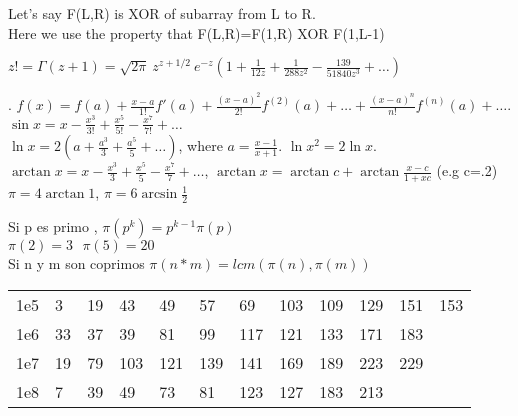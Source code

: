 Let's say F(L,R) is XOR of subarray from L to R.\\
Here we use the property that F(L,R)=F(1,R) XOR F(1,L-1)



$z! = \Gamma(z+1) = \sqrt{2 \pi}\ z^{z+1/2}\ e^{-z}
(1 + \frac{1}{12z} + \frac{1}{288 z^2} - \frac{139}{51840 z^3} + \dots)$

.
$f(x) = f(a) + \frac{x-a}{1!} f'(a) + \frac{(x-a)^2}{2!} f^{(2)}(a) + \dots + \frac{(x-a)^n}{n!} f^{(n)}(a) + \dots$. \\
$\sin x = x - \frac{x^3}{3!} + \frac{x^5}{5!} - \frac{x^7}{7!} + \dots$ \\
$\ln x = 2(a+\frac{a^3}{3}+\frac{a^5}{5}+\dots)$, where $a=\frac{x-1}{x+1}$. $\ln x^2 = 2 \ln x$. \\
$\arctan x = x - \frac{x^3}{3} + \frac{x^5}{5} - \frac{x^7}{7} + \dots$,
$\arctan x = \arctan c + \arctan \frac{x-c}{1+xc}$ (e.g c=.2) \\
$\pi = 4 \arctan 1$, $\pi = 6 \arcsin \frac{1}{2}$

Si p es primo , $ \pi(p^k) = p^{k-1}\pi(p)$\\
$\pi(2)=3 \textit{              }\pi(5)=20 $\\
Si n y m son coprimos $\pi(n*m) = lcm( \pi(n),\pi(m) )$



\begin{tabular}{l l l l l l l l l l l l}
    1e5 & 3 & 19 & 43 & 49 & 57 & 69 & 103 & 109 & 129 & 151 & 153 \\
    1e6 & 33 & 37 & 39 & 81 & 99 & 117 & 121 & 133 & 171 & 183 \\
    1e7 & 19 & 79 & 103 & 121 & 139 & 141 & 169 & 189 & 223 & 229 \\
    1e8 & 7 & 39 & 49 & 73 & 81 & 123 & 127 & 183 & 213 \\
\end{tabular}


